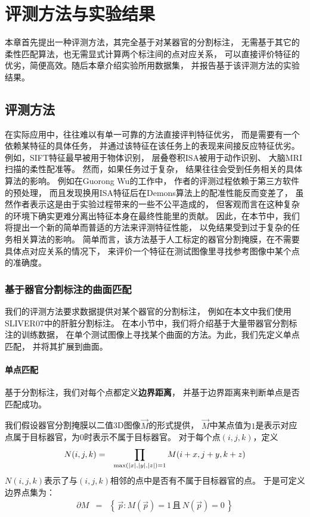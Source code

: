 
\chapter{评测方法与实验结果}
本章首先提出一种评测方法，其完全基于对某器官的分割标注，
无需基于其它的柔性匹配算法，也无需显式计算两个标注间的点对应关系，
可以直接评价特征的优劣，简便高效。随后本章介绍实验所用数据集，
并报告基于该评测方法的实验结果。

\section{评测方法}
在实际应用中，往往难以有单一可靠的方法直接评判特征优劣，
而是需要有一个依赖某特征的具体任务，
并通过该特征在该任务上的表现来间接反应特征优劣。
例如，SIFT特征最早被用于物体识别\cite{lowe1999object}，
层叠卷积ISA被用于动作识别\cite{le2011learning}、
大脑MRI扫描的柔性配准\cite{wu2013unsupervised}等。
然而，如果任务过于复杂，
结果往往会受到任务相关的具体算法的影响。
例如在Guorong Wu的工作\cite{wu2013unsupervised}中，
作者的评测过程依赖于第三方软件的预处理，
而且发现换用ISA特征后在Demons算法上的配准性能反而变差了，
虽然作者表示这是由于实验过程带来的一些不公平造成的，
但客观而言在这种复杂的环境下确实更难分离出特征本身在最终性能里的贡献。
因此，在本节中，我们将提出一个新的简单而普适的方法来评测特征性能，
以免结果受到过于复杂的任务相关算法的影响。
简单而言，该方法基于人工标定的器官分割掩膜，在不需要具体点对应关系的情况下，
来评价一个特征在测试图像里寻找参考图像中某个点的准确度。

\subsection{基于器官分割标注的曲面匹配}
我们的评测方法要求数据提供对某个器官的分割标注，
例如在本文中我们使用SLIVER07中的肝脏分割标注。
在本小节中，我们将介绍基于大量带器官分割标注的训练数据，
在单个测试图像上寻找某个曲面的方法。为此，我们先定义单点匹配，
并将其扩展到曲面。

\subsubsection{单点匹配}
基于分割标注，我们对每个点都定义{\bf 边界距离}，
并基于边界距离来判断单点是否匹配成功。

我们假设器官分割掩膜以二值3D图像$\vec{M}$的形式提供，
$\vec{M}$中某点值为$1$是表示对应点属于目标器官，为$0$时表示不属于目标器官。
对于每个点$(i, j, k)$，定义
\begin{eqnarray}
    N(i, j, k) &=& \prod_{
        \max(\left|x\right|, \left|y\right|, \left|z\right|) = 1}
        M(i + x, j + y, k + z)
\end{eqnarray}
$N(i, j, k)$表示了与$(i, j, k)$相邻的点中是否有不属于目标器官的点。
于是可定义边界点集为：
\begin{eqnarray}
    \partial M &=& \left\{\,\vec{p} : M(\vec{p}) = 1\,\text{且}\,
        N(\vec{p}) = 0\,\right\}
\end{eqnarray}

